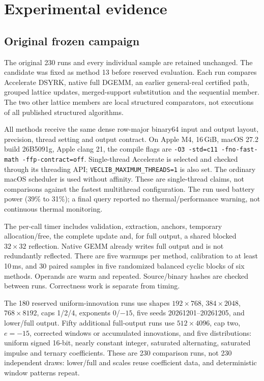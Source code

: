 \documentclass[10pt,a4paper]{article}
\begin{document}
\section{Experimental evidence}\label{sec:experiments}
\subsection{Original frozen campaign}
The original 230 runs and every individual sample are retained unchanged.
The candidate was fixed as method 13 before reserved evaluation. Each run
compares Accelerate DSYRK, native full DGEMM, an earlier general-real certified
path, grouped lattice updates, merged-support substitution and the sequential
member. The two other lattice members are local structured comparators, not
executions of all published structured algorithms.

All methods receive the same dense row-major binary64 input and output layout,
precision, thread setting and output contract. On Apple M4, 16\,GiB,
macOS 27.2 build 26B5091g, Apple clang 21, the compile flags are
\texttt{-O3 -std=c11 -fno-fast-math -ffp-contract=off}.
Single-thread Accelerate is selected and checked through its threading API;
\texttt{VECLIB\_MAXIMUM\_THREADS=1} is also set. The ordinary macOS scheduler
is used without affinity. These are single-thread claims, not comparisons
against the fastest multithread configuration. The run used battery power
(39\% to 31\%); a final query reported no thermal/performance warning, not
continuous thermal monitoring.

The per-call timer includes validation, extraction, anchors, temporary
allocation/free, the complete update and, for full output, a shared blocked
$32\times32$ reflection. Native GEMM already writes full output and is not
redundantly reflected. There are five warmups per method, calibration to at
least 10\,ms, and 30 paired samples in five randomized balanced cyclic blocks
of six methods. Operands are warm and repeated. Source/binary hashes are
checked between runs. Correctness work is separate from timing.

The 180 reserved uniform-innovation runs use shapes $192\times768$,
$384\times2048$, $768\times8192$, caps 1/2/4, exponents 0/$-15$, five seeds
20261201--20261205, and lower/full output. Fifty additional full-output runs
use $512\times4096$, cap two, $e=-15$, corrected windows or accumulated
innovations, and five distributions: uniform signed 16-bit, nearly constant
integer, saturated alternating, saturated impulse and ternary coefficients.
These are 230 comparison runs, not 230 independent draws: lower/full and
scales reuse coefficient data, and deterministic window patterns repeat.
\end{document}
